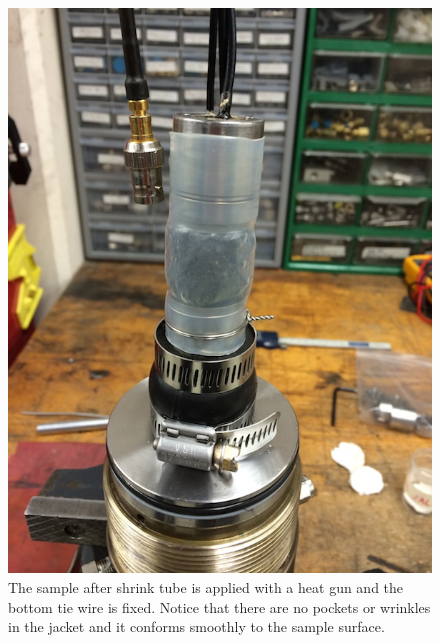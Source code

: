 \begin{figure}
	\centering
        \includegraphics[scale=0.7]{appendix_sample_prep/after_shrink.jpg}
   	\caption{The sample after shrink tube is applied with a heat gun and the bottom tie wire is fixed.  Notice that there are no pockets or wrinkles in the jacket and it conforms smoothly to the sample surface.}
  	\label{after_shrink}
\end{figure}

